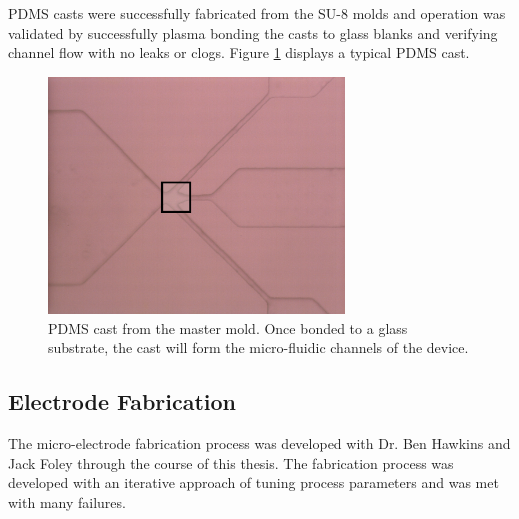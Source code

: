 \par PDMS casts were successfully fabricated from the SU-8 molds and operation was validated by successfully plasma bonding the casts to glass blanks and verifying channel flow with no leaks or clogs. Figure \ref{fig:pdms_results} displays a typical PDMS cast.

\begin{figure}[H]
    \centering
    \includegraphics[width=0.7\textwidth]{images/pdms_channels_outline.png}
    \caption{PDMS cast from the master mold. Once bonded to a glass substrate, the cast will form the micro-fluidic channels of the device.}
    \label{fig:pdms_results}
\end{figure}

\FloatBarrier


\subsection{Electrode Fabrication}

\par The micro-electrode fabrication process was developed with Dr. Ben Hawkins and Jack Foley through the course of this thesis. The fabrication process was developed with an iterative approach of tuning process parameters and was met with many failures.

